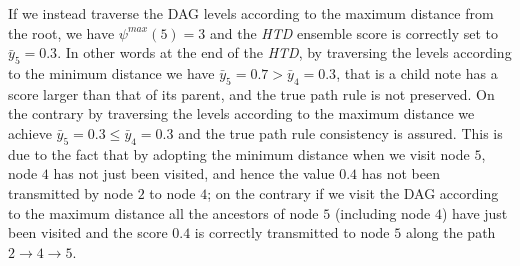 \documentclass{bioinfo}
\begin{document}
\begin{methods}
If we instead traverse the DAG levels according to the maximum distance from the root, we have $\psi^{max}(5)=3$ and the {\em HTD} ensemble score is correctly set to $\bar{y}_5 = 0.3$. In other words at the end of the {\em HTD}, by traversing the levels according to the minimum distance we have $\bar{y}_5 = 0.7 > \bar{y}_4 = 0.3$, that is a child note has a score larger than that of its parent, and the true path rule is not preserved. On the contrary by traversing the levels according to the maximum distance we achieve  $\bar{y}_5 = 0.3 \leq \bar{y}_4 = 0.3$ and the true path rule consistency is assured. 
This is due to the fact that by adopting the minimum distance when we visit node $5$, node $4$ has not just been visited, and hence the value $0.4$ has not been transmitted by node $2$ to node $4$; on the contrary if we visit the DAG according to the maximum distance all the ancestors of node $5$ (including node $4$) have just been visited and the score $0.4$ is correctly transmitted to node $5$ along the path $2 \rightarrow 4 \rightarrow 5$.


\end{methods}
\end{document}
